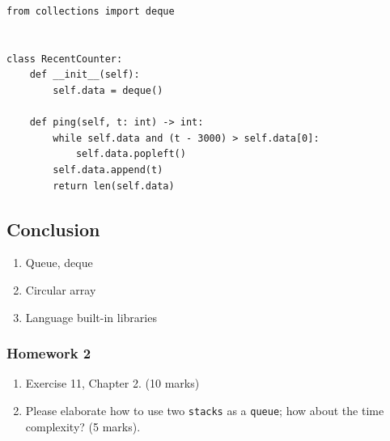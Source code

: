 \documentclass[aspectratio=169, 14pt]{beamer}
\begin{document}
\begin{frame}[fragile]

    \begin{verbatim}
from collections import deque


class RecentCounter:
    def __init__(self):
        self.data = deque()

    def ping(self, t: int) -> int:
        while self.data and (t - 3000) > self.data[0]:
            self.data.popleft()
        self.data.append(t)
        return len(self.data)
        \end{verbatim}

\end{frame}

\begin{frame}
\section{\textcolor{darkmidnightblue}{Conclusion}}
    \begin{enumerate}
        \item Queue, deque
        \item Circular array
        \item Language built-in libraries
    \end{enumerate}
\end{frame}
\begin{frame}
    \frametitle{Homework 2}
\begin{enumerate}
    \item Exercise 11, Chapter 2. (10 marks)
    \item Please elaborate how to use two \texttt{stacks} as a \texttt{queue}; how about the time complexity?  (5 marks).
\end{enumerate}
\end{frame}
\end{document}
